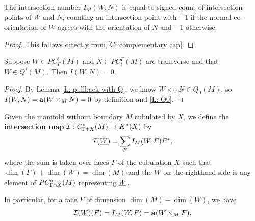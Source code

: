 \begin{lemma}\label{L: intersection number}
The intersection number $I_M(W,N)$ is equal to signed count of intersection points of $W$ and $N$, counting an intersection point with $+1$ if  the normal co-orientation of $W$ agrees with the orientation of $N$ and $-1$ otherwise.
\end{lemma}
\begin{proof}
This follows directly from \cref{C: complementary cap}.

\end{proof}

\begin{lemma}\label{L: Q-trivial intersection}
Suppose $W\in PC_\Gamma^i(M)$ and $N\in PC_{i}^\Gamma(M)$ are transverse and that $W\in Q^i(M)$. Then $I(W,N)=0$.
\end{lemma}
\begin{proof}
By Lemma \ref{L: pullback with Q}, we know $W\times_M N\in Q_0(M)$, so $I(W,N)=\mathbf{a}(W\times_MN)=0$ by definition and \cref{L: Q0}.
\end{proof}


\begin{definition}\label{D: intersection homomorphism}
Given the manifold without boundary $M$ cubulated by $X$, we define the \textbf{intersection map} $\mathcal{I}: C^*_{\Gamma\pitchfork X}(M)\to K^*(X)$ by $$\mathcal{I}(\underline{W})=\sum_F I_M(W,F)F^*,$$ where the sum is taken over faces $F$ of the cubulation $X$ such that $\dim(F)+\dim(W)=\dim(M)$ and the $W$ on the righthand side is any element of $PC^*_{\Gamma\pitchfork X}(M)$ representing $\underline{W}$.

In particular, for a face $F$ of dimension $\dim(M)-\dim(W)$, we have $$\mathcal{I}(\underline{W})(F)=I_M(W,F)=\mathbf{a}(W\times_MF).$$ 
\end{definition}




